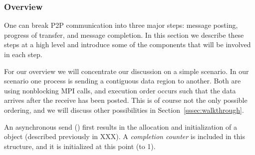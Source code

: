 \subsubsection{Overview}

% 
% 
% 

One can break P2P communication into three major steps: message
posting, progress of transfer, and message completion.  In this section we
describe these steps at a high level and introduce some of the components that
will be involved in each step.

% 

For our overview we will concentrate our discussion on a simple scenario.  In
our scenario one process is sending a contiguous data region to another.  Both
are using nonblocking MPI calls, and execution order occurs such that the data
arrives after the receive has been posted.  This is of course not the only
possible ordering, and we will discuss other possibilities in
Section~\ref{sssec:walkthrough}.

\begin{comment}
  \emph{include a figure showing the actual code snippets}
\end{comment}


An asynchronous send () first results in the allocation and
initialization of a  object (described previously in
XXX).  A \emph{completion counter} is included in this structure, and it is
initialized at this point (to 1).
%


\begin{comment}
  \emph{we should explain why the completion counter is set to a value of 1, or
    do something to clear this up.}
\end{comment}

